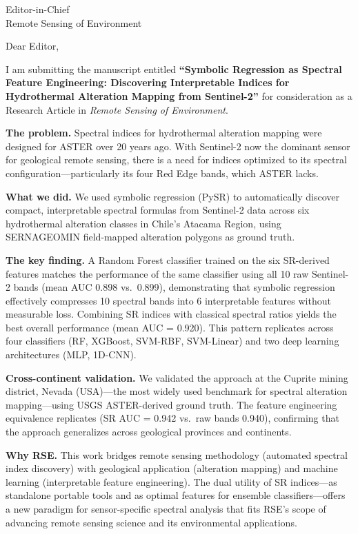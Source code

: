 \documentclass[11pt]{letter}
\begin{document}
\begin{letter}{Editor-in-Chief\\Remote Sensing of Environment}

\opening{Dear Editor,}

I am submitting the manuscript entitled \textbf{``Symbolic Regression as Spectral Feature Engineering: Discovering Interpretable Indices for Hydrothermal Alteration Mapping from Sentinel-2''} for consideration as a Research Article in \textit{Remote Sensing of Environment}.

\textbf{The problem.} Spectral indices for hydrothermal alteration mapping were designed for ASTER over 20 years ago. With Sentinel-2 now the dominant sensor for geological remote sensing, there is a need for indices optimized to its spectral configuration---particularly its four Red Edge bands, which ASTER lacks.

\textbf{What we did.} We used symbolic regression (PySR) to automatically discover compact, interpretable spectral formulas from Sentinel-2 data across six hydrothermal alteration classes in Chile's Atacama Region, using SERNAGEOMIN field-mapped alteration polygons as ground truth.

\textbf{The key finding.} A Random Forest classifier trained on the six SR-derived features matches the performance of the same classifier using all 10 raw Sentinel-2 bands (mean AUC 0.898 vs.\ 0.899), demonstrating that symbolic regression effectively compresses 10 spectral bands into 6 interpretable features without measurable loss. Combining SR indices with classical spectral ratios yields the best overall performance (mean AUC = 0.920). This pattern replicates across four classifiers (RF, XGBoost, SVM-RBF, SVM-Linear) and two deep learning architectures (MLP, 1D-CNN).

\textbf{Cross-continent validation.} We validated the approach at the Cuprite mining district, Nevada (USA)---the most widely used benchmark for spectral alteration mapping---using USGS ASTER-derived ground truth. The feature engineering equivalence replicates (SR AUC = 0.942 vs.\ raw bands 0.940), confirming that the approach generalizes across geological provinces and continents.

\textbf{Why RSE.} This work bridges remote sensing methodology (automated spectral index discovery) with geological application (alteration mapping) and machine learning (interpretable feature engineering). The dual utility of SR indices---as standalone portable tools and as optimal features for ensemble classifiers---offers a new paradigm for sensor-specific spectral analysis that fits RSE's scope of advancing remote sensing science and its environmental applications.


\end{letter}
\end{document}
